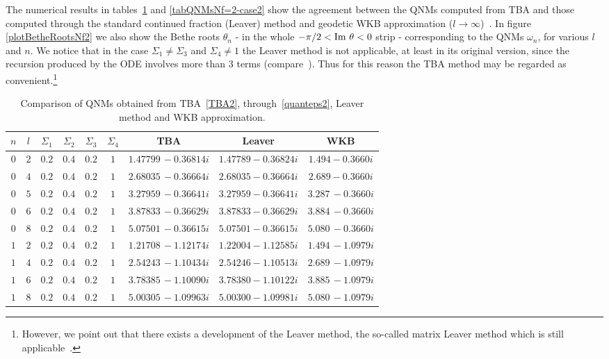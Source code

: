 \documentclass[11pt,a4paper]{elsarticle}
\def\Im{{\rm Im ~}}
\numberwithin{figure}{section}
\numberwithin{table}{section}
\begin{document}
The numerical results in tables~\ref{tabQNMsNf=2-case1} and \ref{tabQNMsNf=2-case2} show the agreement between the QNMs computed from TBA and those computed through the standard continued fraction (Leaver) method and geodetic WKB approximation ($l \to \infty$)~\cite{Leaver:1985}. In figure \ref{plotBetheRootsNf2} we also show the Bethe roots $\theta_n$ - in the whole $- \pi/2 <\Im \theta<0$ strip - corresponding to the QNMs $\omega_n$, for various $l$ and $n$. We notice that in the case $\Sigma_1 \neq \Sigma_3$ and $\Sigma_4 \neq 1$ the Leaver method is not applicable, at least in its original version, since the recursion produced by the ODE involves more than $3$ terms (compare~\cite{BianchiConsoliGrilloMorales:2021,Leaver:1985}). Thus for this reason the TBA method may be regarded as convenient.\footnote{However, we point out that there exists a development of the Leaver method, the so-called matrix Leaver method which is still applicable~\cite{Leaver:1990,KumarBannonPribytokRodgers:2020}.}
\begin{table}[t]
\centering
\begin{tabular}{c|c|c|c|c|c|c|c|c}
$n$&$l $&$\Sigma_1$&$\Sigma_2$&$\Sigma_3$&$\Sigma_4$& TBA&Leaver& WKB  \\
\hline
$0$& $2$&$0.2$&$0.4$&$0.2$&$1$&$1.47799\, -0.36814 i$&$1.47789-0.36824 i$&$1.494 -0.3660 i$\\
$0$&$4$&$0.2$&$0.4$&$0.2$&$1$&$2.68035\, -0.36664 i$&$2.68035-0.36664 i$&$2.689-0.3660 i$\\
$0$&$5 $&$0.2$&$0.4$&$0.2$&$1$& $3.27959\, -0.36641 i$&$3.27959-0.36641 i$&$3.287\, -0.3660 i$\\
$0$&$6 $&$0.2$&$0.4$&$0.2$&$1$& $3.87833\, -0.36629 i$&$3.87833-0.36629 i$&$3.884\, -0.3660 i$\\
$0$&$8 $&$0.2$&$0.4$&$0.2$&$1$& $5.07501\, -0.36615 i$&$5.07501-0.36615 i$&$5.080\, -0.3660 i$\\
$1$& $2$&$0.2$&$0.4$&$0.2$&$1$&$1.21708\, -1.12174 i$&$1.22004-1.12585 i$&$ 1.494 \, - 1.0979 i$\\
$1$&$ 4$&$0.2$&$0.4$&$0.2$&$1$&$2.54243\, -1.10434 i$&$2.54246-1.10513 i$&$2.689\, - 1.0979 i$\\
$1$& $6$&$0.2$&$0.4$&$0.2$&$1$ &$3.78385\, -1.10090 i$&$3.78380-1.10122 i$&$ 3.885\, - 1.0979 i$\\
$1$& $8$&$0.2$&$0.4$&$0.2$&$1$ &$5.00305\, -1.09963 i$&$5.00300-1.09981 i$&$ 5.080\, - 1.0979 i$\\
\end{tabular}
\caption{Comparison of QNMs obtained from TBA~\eqref{TBA2}, through~\eqref{quanteps2}, Leaver method and WKB approximation.}\label{tabQNMsNf=2-case1}
\end{table}
\end{document}
